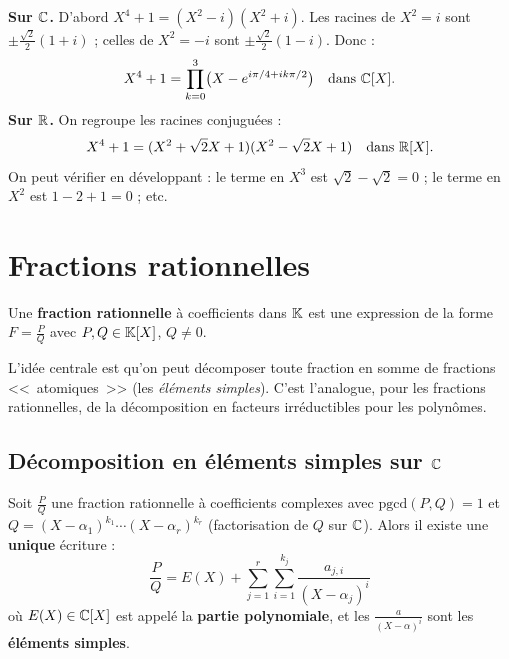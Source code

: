 \begin{exbox}[Factorisation de $X^4 + 1$]
\textbf{Sur $\mathbb{C}$.} D'abord $X^4 + 1 = (X^2 - i)(X^2 + i)$. Les racines de $X^2 = i$ sont $\pm \frac{\sqrt{2}}{2}(1 + i)$ ; celles de $X^2 = -i$ sont $\pm \frac{\sqrt{2}}{2}(1 - i)$. Donc :
\[
  X^4 + 1 = \prod_{k=0}^{3} \bigl(X - e^{i \pi/4 + i k \pi/2}\bigr) \quad \text{dans } \mathbb{C}[X].
\]
\textbf{Sur $\mathbb{R}$.} On regroupe les racines conjuguées :
\[
  X^4 + 1 = (X^2 + \sqrt{2} X + 1)(X^2 - \sqrt{2} X + 1) \quad \text{dans } \mathbb{R}[X].
\]
On peut vérifier en développant : le terme en $X^3$ est $\sqrt{2} - \sqrt{2} = 0$ ; le terme en $X^2$ est $1 - 2 + 1 = 0$ ; etc.
\end{exbox}


\section{Fractions rationnelles}

\begin{defbox}
Une \textbf{fraction rationnelle} à coefficients dans $\mathbb{K}$ est une expression de la forme $F = \frac{P}{Q}$ avec $P, Q \in \mathbb{K}[X]$, $Q \neq 0$.
\end{defbox}

L'idée centrale est qu'on peut décomposer toute fraction en somme de fractions <<~atomiques~>> (les \emph{éléments simples}). C'est l'analogue, pour les fractions rationnelles, de la décomposition en facteurs irréductibles pour les polynômes.

\subsection{Décomposition en éléments simples sur $\mathbb{C}$}

\begin{thmbox}
Soit $\frac{P}{Q}$ une fraction rationnelle à coefficients complexes avec $\text{pgcd}(P, Q) = 1$ et $Q = (X - \alpha_1)^{k_1} \cdots (X - \alpha_r)^{k_r}$ (factorisation de $Q$ sur $\mathbb{C}$). Alors il existe une \textbf{unique} écriture :
\[
  \frac{P}{Q} = E(X) + \sum_{j = 1}^{r} \sum_{i = 1}^{k_j} \frac{a_{j, i}}{(X - \alpha_j)^i}
\]
où $E(X) \in \mathbb{C}[X]$ est appelé la \textbf{partie polynomiale}, et les $\frac{a}{(X - \alpha)^i}$ sont les \textbf{éléments simples}.
\end{thmbox}


